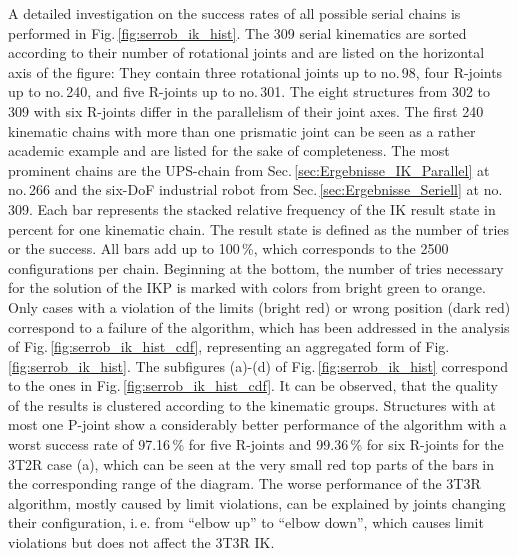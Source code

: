 \documentclass[robotics,article,submit,moreauthors,pdftex]{Definitions/mdpi}
\begin{document}
A detailed investigation on the success rates of all possible serial chains is performed in Fig.\,\ref{fig:serrob_ik_hist}.
The 309 serial kinematics are sorted according to their number of rotational joints and are listed on the horizontal axis of the figure: They contain three rotational joints up to no.\,98, four R-joints up to no.\,240, and five R-joints up to no.\,301.
The eight structures from 302 to 309 with six R-joints differ in the parallelism of their joint axes.
The first 240 kinematic chains with more than one prismatic joint can be seen as a rather academic example and are listed for the sake of completeness.
The most prominent chains are the UPS-chain from Sec.\,\ref{sec:Ergebnisse_IK_Parallel} at no.\,266 and the six-DoF industrial robot from Sec.\,\ref{sec:Ergebnisse_Seriell} at no.\,309.
Each bar represents the stacked relative frequency of the IK result state in percent for one kinematic chain.
The result state is defined as the number of tries or the success.
All bars add up to 100\,\%, which corresponds to the 2500 configurations per chain.
Beginning at the bottom, the number of tries necessary for the solution of the IKP is marked with colors from bright green to orange.
Only cases with a violation of the limits (bright red) or wrong position (dark red) correspond to a failure of the algorithm, which has been addressed in the analysis of Fig.\,\ref{fig:serrob_ik_hist_cdf}, representing an aggregated form of Fig.\,\ref{fig:serrob_ik_hist}.
The subfigures (a)-(d) of Fig.\,\ref{fig:serrob_ik_hist} correspond to the ones in Fig.\,\ref{fig:serrob_ik_hist_cdf}.
It can be observed, that the quality of the results is clustered according to the kinematic groups.
Structures with at most one P-joint show a considerably better performance of the algorithm with a worst success rate of 97.16\,\% for five R-joints %
and 99.36\,\% for six R-joints %
for the 3T2R case (a), which can be seen at the very small red top parts of the bars in the corresponding range of the diagram.
The worse performance of the 3T3R algorithm, mostly caused by limit violations, can be explained by joints changing their configuration, i.\,e. from ``elbow up'' to ``elbow down'', which causes limit violations but does not affect the 3T3R IK.
\end{document}

